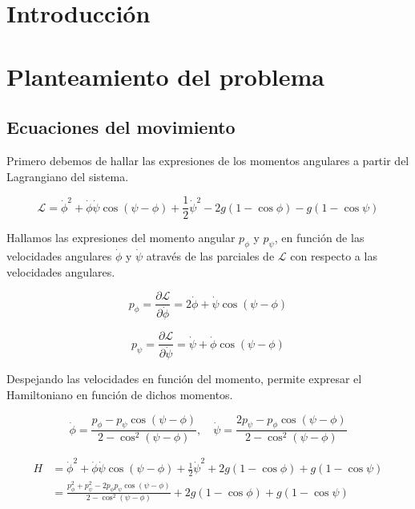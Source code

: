 \documentclass[11pt, twoside]{article} %
\begin{document}
\pagestyle{main}

\section{Introducción}

\section{Planteamiento del problema}
\subsection{Ecuaciones del movimiento}
Primero debemos de hallar las expresiones de los momentos angulares
a partir del Lagrangiano del sistema. 

\begin{equation}
    \mathcal{L} = \dot{\phi}^2 + \dot{\phi}\dot{\psi} \cos(\psi - \phi) +
     \frac{1}{2}\dot{\psi}^2 - 2g(1-\cos\phi) - g(1-\cos\psi) 
\end{equation}

Hallamos las expresiones del momento angular $p_\phi$ y $p_\psi$, en función
de las velocidades angulares $\dot{\phi}$ y $\dot{\psi}$ através de las 
parciales de $\mathcal{L}$ con respecto a las velocidades angulares.

\begin{equation}
    p_\phi = \frac{\partial \mathcal{L}}{\partial \dot{\phi}} = 2\dot{\phi} + \dot{\psi}\cos(\psi - \phi)
\end{equation}

\begin{equation}
    p_\psi = \frac{\partial \mathcal{L}}{\partial \dot{\psi}} = \dot{\psi} + \dot{\phi}\cos(\psi - \phi)
\end{equation}

Despejando las velocidades en función del momento, permite expresar el 
Hamiltoniano en función de dichos momentos.

\begin{equation}
    \dot{\phi} = \frac{p_\phi - p_\psi\cos(\psi - \phi)}{2-\cos^2(\psi - \phi)}, \quad 
    \dot{\psi} = \frac{2p_\psi - p_\phi\cos(\psi - \phi)}{2-\cos^2(\psi - \phi)}
\end{equation}

\begin{equation}
    \begin{split}
        H &= \dot{\phi}^2 + \dot{\phi}\dot{\psi} \cos(\psi - \phi) +
\frac{1}{2}\dot{\psi}^2 + 2g(1-\cos\phi) + g(1-\cos\psi)  \\
 &=\frac{p_\phi^2 + p_\psi^2 - 2p_\phi p_\psi \cos(\psi - \phi)}{2-\cos^2(\psi - \phi)} + 2g(1-\cos\phi) + g(1-\cos\psi)
    \end{split}
\end{equation}
\end{document}
